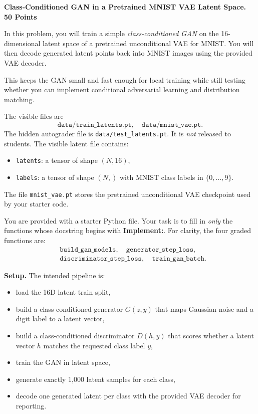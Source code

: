 \begin{Q}
\textbf{Class-Conditioned GAN in a Pretrained MNIST VAE Latent Space. 50 Points}

In this problem, you will train a simple \emph{class-conditioned GAN} on the 16-dimensional latent space of a pretrained unconditional VAE for MNIST.
You will then decode generated latent points back into MNIST images using the provided VAE decoder.

This keeps the GAN small and fast enough for local training while still testing whether you can implement conditional adversarial learning and distribution matching.

The visible files are
\[
\texttt{data/train\_latents.pt},\quad
\texttt{data/mnist\_vae.pt}.
\]
The hidden autograder file is \texttt{data/test\_latents.pt}. It is \emph{not} released to students.
The visible latent file contains:
\begin{itemize}
\item \texttt{latents}: a tensor of shape $(N, 16)$,
\item \texttt{labels}: a tensor of shape $(N,)$ with MNIST class labels in $\{0,\dots,9\}$.
\end{itemize}
The file \texttt{mnist\_vae.pt} stores the pretrained unconditional VAE checkpoint used by your starter code.

You are provided with a starter Python file.
Your task is to fill in \emph{only} the functions whose docstring begins with \textbf{Implement:}.
For clarity, the four graded functions are:
\begin{align*}
&\texttt{build\_gan\_models},\quad
\texttt{generator\_step\_loss},\\
&\texttt{discriminator\_step\_loss},\quad
\texttt{train\_gan\_batch}.
\end{align*}

\medskip
\noindent\textbf{Setup.}
The intended pipeline is:
\begin{itemize}
\item load the 16D latent train split,
\item build a class-conditioned generator $G(z, y)$ that maps Gaussian noise and a digit label to a latent vector,
\item build a class-conditioned discriminator $D(h, y)$ that scores whether a latent vector $h$ matches the requested class label $y$,
\item train the GAN in latent space,
\item generate exactly 1{,}000 latent samples for each class,
\item decode one generated latent per class with the provided VAE decoder for reporting.
\end{itemize}


\end{Q}
